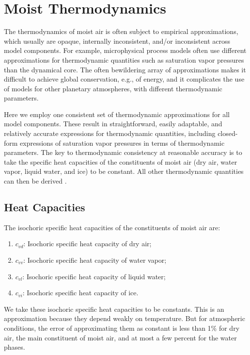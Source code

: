 \documentclass{article}
\begin{document}
\section{Moist Thermodynamics}\label{s:thermodynamics}

The thermodynamics of moist air is often subject to empirical approximations, which usually are opaque, internally inconsistent, and/or inconsistent across model components. For example, microphysical process models often use different approximations for thermodynamic quantities such as saturation vapor pressures than the dynamical core. The often bewildering array of approximations makes it difficult to achieve global conservation, e.g., of energy, and it complicates the use of models for other planetary atmospheres, with different thermodynamic parameters. 

Here we employ one consistent set of thermodynamic approximations for all model components. These result in straightforward, easily adaptable, and relatively accurate expressions for thermodynamic quantities, including closed-form expressions of saturation vapor pressures in terms of thermodynamic parameters. The key to thermodynamic consistency at reasonable accuracy is to take the specific heat capacities of the constituents of moist air (dry air, water vapor, liquid water, and ice) to be constant. All other thermodynamic quantities can then be derived \citep[cf.][]{Romps08a}. 

\subsection{Heat Capacities}\label{s:heat_capacities}

The isochoric specific heat capacities of the constituents of moist air are:
\begin{enumerate}
    \item $c_{vd}$: Isochoric specific heat capacity of dry air;
    \item $c_{vv}$: Isochoric specific heat capacity of water vapor;
    \item $c_{vl}$: Isochoric specific heat capacity of liquid water;
    \item $c_{vi}$: Isochoric specific heat capacity of ice.
\end{enumerate}
We take these isochoric specific heat capacities to be constants. This is an approximation because they depend weakly on temperature. But for atmospheric conditions, the error of approximating them as constant is less than 1\% for dry air, the main constituent of moist air, and at most a few percent for the water phases.
\end{document}
